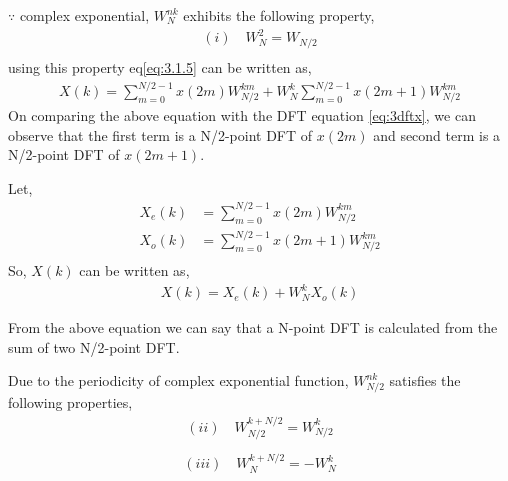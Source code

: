 \documentclass{beamer}
\begin{document}
\begin{frame}
$\because$ complex exponential, $W_{N}^{nk}$ exhibits the following property,
\begin{align}
   (i) \quad W^{2}_{N} = W_{N/2}
\end{align}
\begin{align}
    [ \because (e^{-j2\pi kn/N})^2 = e^{-j2\pi kn/{(N/2)}}]
\end{align}
 using this property eq\eqref{eq:3.1.5} can be written as,
\begin{align}
    X(k) = \sum_{m=0}^{{N/2}-1} x(2m)W^{km}_{N/2} +W^{k}_{N} \sum_{m=0}^{{N/2}-1} x(2m+1)W^{km}_{N/2} \label{eq:3.1.8}
\end{align}
On comparing the above equation with the DFT equation \eqref{eq:3dftx}, we can observe that the first term is a N/2-point DFT of $x(2m)$ and second term is a N/2-point DFT of $x(2m+1)$. 
\end{frame}
\begin{frame}
    

Let,
\begin{align}
    X_{e}(k) &= \sum_{m=0}^{{N/2}-1} x(2m)W^{km}_{N/2} \\
    X_{o}(k) &= \sum_{m=0}^{{N/2}-1} x(2m+1)W^{km}_{N/2} \\
\end{align}
So, $X(k)$ can be written as,
\begin{align}
    X(k) = X_{e}(k) + W_{N}^k X_{o}(k) \label{eq:3.1.13}
\end{align}

From the above equation we can say that a N-point DFT is calculated from the sum of two N/2-point DFT.
\end{frame}
\begin{frame}
Due to the periodicity of complex exponential function, $W_{N/2}^{nk}$ satisfies the following properties,
\begin{align}
  (ii) \quad W^{k+N/2}_{N/2} = W^{k}_{N/2}
\end{align}
\begin{align}
   [ \because e^{-j2\pi (k+N/2)/(N/2)} &= e^{-j2\pi k/(N/2)}.e^{-j2\pi  } \\
    &= e^{-j2\pi k/(N/2)}.1 \\
    &= e^{-j2\pi k/(N/2)} ]
\end{align}
\begin{align}
  (iii)\quad  W^{k+N/2}_{N} = -W^{k}_{N}\end{align}
\begin{align}
   [ \because e^{-j2\pi (k+N/2)/N} &= e^{-j2\pi k/N}.e^{-j\pi } \\
    &= e^{-j2\pi k/N}.(-1) \\
    &= -e^{-j2\pi k/N} ]
\end{align}
\end{frame}
\end{document}
